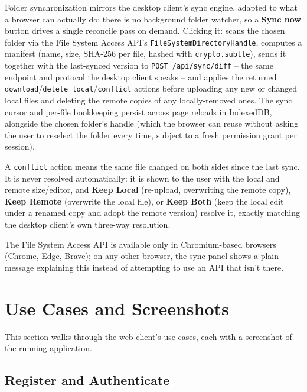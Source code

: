 \documentclass[12pt,a4paper]{article}
\begin{document}
Folder synchronization mirrors the desktop client's sync engine, adapted to what a browser can actually do: there is no background folder watcher, so a \textbf{Sync now} button drives a single reconcile pass on demand. Clicking it: scans the chosen folder via the File System Access API's \texttt{FileSystemDirectoryHandle}, computes a manifest (name, size, SHA-256 per file, hashed with \texttt{crypto.subtle}), sends it together with the last-synced version to \texttt{POST /api/sync/diff} -- the same endpoint and protocol the desktop client speaks -- and applies the returned \texttt{download}/\texttt{delete\_local}/\texttt{conflict} actions before uploading any new or changed local files and deleting the remote copies of any locally-removed ones. The sync cursor and per-file bookkeeping persist across page reloads in IndexedDB, alongside the chosen folder's handle (which the browser can reuse without asking the user to reselect the folder every time, subject to a fresh permission grant per session).

A \texttt{conflict} action means the same file changed on both sides since the last sync. It is never resolved automatically: it is shown to the user with the local and remote size/editor, and \textbf{Keep Local} (re-upload, overwriting the remote copy), \textbf{Keep Remote} (overwrite the local file), or \textbf{Keep Both} (keep the local edit under a renamed copy and adopt the remote version) resolve it, exactly matching the desktop client's own three-way resolution.

The File System Access API is available only in Chromium-based browsers (Chrome, Edge, Brave); on any other browser, the sync panel shows a plain message explaining this instead of attempting to use an API that isn't there.

\section{Use Cases and Screenshots}
\label{sec:usecases}

This section walks through the web client's use cases, each with a screenshot of the running application.

\subsection{Register and Authenticate}
\end{document}
